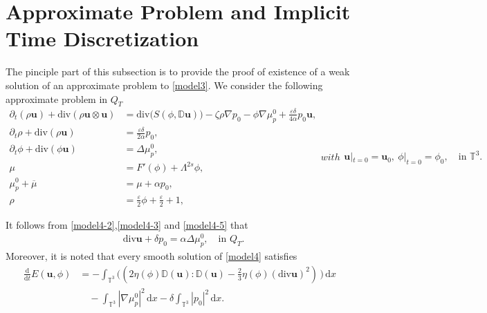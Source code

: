 \documentclass[reqno,a4paper,11pt]{amsart}
\theoremstyle{plain}
\numberwithin{equation}{section}
\newcommand{\bb}[1]{\mathbb{#1}}
\newcommand{\bbt}{\bb{T}}
\begin{document}
\section{Approximate Problem and Implicit Time Discretization}
\label{sec:approximation}
The pinciple part of this subsection is to provide the proof of existence of a weak solution of an approximate problem  to \eqref{model3}.  We consider the following approximate problem in $Q_T$
\begin{subequations}
	\label{model4}
	\begin{align}
		\label{model4-1}
		\partial_t(\rho  \mathbf{u}) + \mathrm{div}\left (\rho  \mathbf{u}\otimes
		\mathbf{u}\right) 
		& = \mathrm{div}\big(S(\phi,\mathbb{ D}\mathbf{u})\big)
		- \zeta\rho\nabla p_{0}
		- \phi \nabla \mu_{p}^{0}
		+ \frac{\varepsilon\delta}{4\alpha}  p_{0} \mathbf{u}, 
		\\\label{model4-2}
		\partial_t \rho+\mathrm{div} (\rho \mathbf{u})& =\frac{\varepsilon\delta}{2\alpha} p_{0}, 
		\\
		\label{model4-3}
		\partial_t\phi + \mathrm{div}(\phi  \mathbf{u})& =\Delta\mu_p^{0}, \\
		\label{model4-4}
		\mu& =F'(\phi)+\Lambda^{2s} \phi, \\
		\label{model4-5}
		\mu_p^{0}+\overline{\mu}& =\mu+\alpha p_{0}, \\\rho& =\frac{\varepsilon}{2}\phi+\frac{\varepsilon}{2}+1,
	\end{align}
	with
	\begin{align}
		\label{model4-5-0}\mathbf{u}|_{t=0}=\mathbf{u}_{0},\ \phi|_{t=0}=\phi_{0}, \quad\text{in $\bbt^3$}.
	\end{align}
\end{subequations}

It follows from \eqref{model4-2},\eqref{model4-3}  and \eqref{model4-5} that
\begin{align}
	\label{model4-6}
	&\mathrm{div}  \mathbf{u} +\delta p_{0}= \alpha \Delta\mu_p^{0}, \quad\text{in $Q_{T}$}.
\end{align}
Moreover, it is noted that every smooth solution of \eqref{model4} satisfies
\begin{align}\label{ConEnL3}
	\nonumber\frac{\mathrm d}{\mathrm dt}E(\mathbf{u}, \phi)&=
	-\int_{\mathbb{T}^{3}}\big( (2 \eta(\phi)
	\mathbb{ D}(\mathbf{u}):\mathbb{ D}(\mathbf{u})-\frac{2}{3}\eta(\phi) (\mathrm{div} \mathbf{u})^2)\,\big)\, \mathrm{d} x \\
	& \quad
	-\int_{\mathbb{T}^{3}} |\nabla \mu_p^0|^2\, \mathrm{d} x
	-\delta\int_{\mathbb{T}^{3}} |p_{0}|^{2}  \, \mathrm{d} x.
\end{align}
\end{document}
